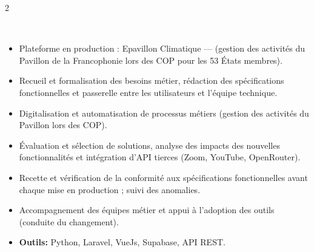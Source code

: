\documentclass[10pt,a4paper,ragged2e,withhyper]{altacv}
\begin{document}
\begin{paracol}{2}
             \\

             \\


        \switchcolumn




            \begin{itemize}
                \item Plateforme en production : Epavillon Climatique —  (gestion des activités du Pavillon de la Francophonie lors des COP pour les 53 États membres).
                \item Recueil et formalisation des besoins métier, rédaction des spécifications fonctionnelles et passerelle entre les utilisateurs et l'équipe technique.
                \item Digitalisation et automatisation de processus métiers (gestion des activités du Pavillon lors des COP).
                \item Évaluation et sélection de solutions, analyse des impacts des nouvelles fonctionnalités et intégration d'API tierces (Zoom, YouTube, OpenRouter).
                \item Recette et vérification de la conformité aux spécifications fonctionnelles avant chaque mise en production ; suivi des anomalies.
                \item Accompagnement des équipes métier et appui à l'adoption des outils (conduite du changement).
                \item \textcolor{SecondaryColor}{\textbf{Outils: }} Python, Laravel, VueJs, Supabase, API REST.
            \end{itemize}
            \divider


\end{paracol}
\end{document}
